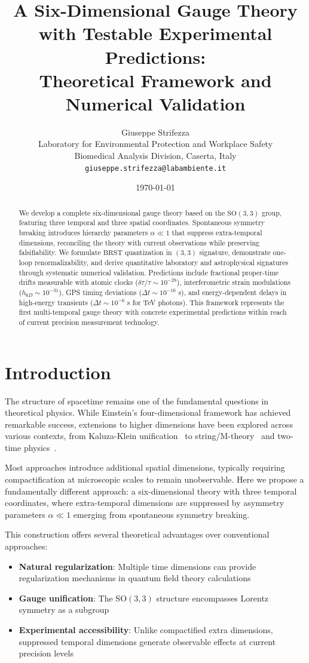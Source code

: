 \documentclass[12pt,a4paper]{article}
\title{A Six-Dimensional Gauge Theory with Testable Experimental Predictions:\\ Theoretical Framework and Numerical Validation}
\author{Giuseppe Strifezza\\
\small Laboratory for Environmental Protection and Workplace Safety\\
\small Biomedical Analysis Division, Caserta, Italy\\
\small \texttt{giuseppe.strifezza@labambiente.it}}
\date{\today}
\newcommand{\SO}{\text{SO}}
\newcommand{\BRST}{\text{BRST}}
\begin{document}
\maketitle

\begin{abstract}
We develop a complete six-dimensional gauge theory based on the $\SO(3,3)$ group, featuring three temporal and three spatial coordinates. Spontaneous symmetry breaking introduces hierarchy parameters $\alpha \ll 1$ that suppress extra-temporal dimensions, reconciling the theory with current observations while preserving falsifiability. We formulate $\BRST$ quantization in $(3,3)$ signature, demonstrate one-loop renormalizability, and derive quantitative laboratory and astrophysical signatures through systematic numerical validation. Predictions include fractional proper-time drifts measurable with atomic clocks ($\delta\tau/\tau \sim 10^{-28}$), interferometric strain modulations ($h_{6D} \sim 10^{-31}$), GPS timing deviations ($\Delta t \sim 10^{-16}$ s), and energy-dependent delays in high-energy transients ($\Delta t \sim 10^{-6}$ s for TeV photons). This framework represents the first multi-temporal gauge theory with concrete experimental predictions within reach of current precision measurement technology.
\end{abstract}

\tableofcontents
\newpage

\section{Introduction}
\label{sec:introduction}

The structure of spacetime remains one of the fundamental questions in theoretical physics. While Einstein's four-dimensional framework has achieved remarkable success, extensions to higher dimensions have been explored across various contexts, from Kaluza-Klein unification~\cite{kaluza1921,klein1926} to string/M-theory~\cite{witten1995} and two-time physics~\cite{bars2000,bars2001}.

Most approaches introduce additional spatial dimensions, typically requiring compactification at microscopic scales to remain unobservable. Here we propose a fundamentally different approach: a six-dimensional theory with three temporal coordinates, where extra-temporal dimensions are suppressed by asymmetry parameters $\alpha \ll 1$ emerging from spontaneous symmetry breaking.

This construction offers several theoretical advantages over conventional approaches:
\begin{itemize}
\item \textbf{Natural regularization}: Multiple time dimensions can provide regularization mechanisms in quantum field theory calculations
\item \textbf{Gauge unification}: The $\SO(3,3)$ structure encompasses Lorentz symmetry as a subgroup
\item \textbf{Experimental accessibility}: Unlike compactified extra dimensions, suppressed temporal dimensions generate observable effects at current precision levels
\end{itemize}
\end{document}
